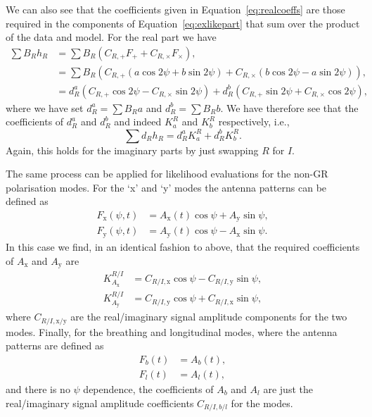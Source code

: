 We can also see that the coefficients given in Equation~\ref{eq:realcoeffs} are those required in the components of
Equation~\ref{eq:exlikepart} that sum over the product of the data and model. For the real part we have
\begin{align}
\sum B_Rh_R &= \sum B_R\left(C_{R,+}F_+ + C_{R,\times}F_{\times} \right), \nonumber \\
 &=\sum B_R\left( C_{R,+}\left(a\cos{2\psi}+b\sin{2\psi}\right) + C_{R,\times}\left(b\cos{2\psi} - a\sin{2\psi} \right) \right), \nonumber \\
 &= d^a_R\left(C_{R,+}\cos{2\psi} - C_{R,\times}\sin{2\psi}\right) + d^b_R\left(C_{R,+}\sin{2\psi} + C_{R,\times}\cos{2\psi} \right),
\end{align}
where we have set $d^a_R = \sum B_R a$ and $d^b_R = \sum B_R b$. We have therefore see that the coefficients
of $d^a_R$ and $d^b_R$ and indeed $K_a^R$ and $K_b^R$ respectively, i.e.,
\begin{equation}
\sum d_Rh_R = d^a_RK_a^R + d^b_RK_b^R.
\end{equation}
Again, this holds for the imaginary parts by just swapping $R$ for $I$.

The same process can be applied for likelihood evaluations for the non-GR polarisation modes. For the `x' and `y'
modes the antenna patterns can be defined as \citep[Equations~32 and 33 of][]{2015PhRvD..91h2002I}
\begin{align}
F_{\text{x}}(\psi,t) &= A_{\text{x}}(t)\cos{\psi} + A_{\text{y}}\sin{\psi}, \nonumber \\
F_{\text{y}}(\psi,t) &= A_{\text{y}}(t)\cos{\psi} - A_{\text{x}}\sin{\psi}.
\end{align}
In this case we find, in an identical fashion to above, that the required coefficients of $A_{\text{x}}$ and $A_{\text{y}}$ are
\begin{align}\label{eq:realcoeffsxy}
K_{A_{\text{x}}}^{R/I} &= C_{R/I,\text{x}}\cos{\psi} - C_{R/I,\text{y}}\sin{\psi}, \nonumber \\
K_{A_{\text{y}}}^{R/I} &= C_{R/I,\text{y}}\cos{\psi} + C_{R/I,\text{x}}\sin{\psi},
\end{align}
where $C_{R/I,\text{x}/\text{y}}$ are the real/imaginary signal amplitude components for the two modes.
Finally, for the breathing and longitudinal modes, where the antenna patterns are defined as \citep[Equations~34 and 35 of][]{2015PhRvD..91h2002I}
\begin{align}
F_{b}(t) &= A_{b}(t), \nonumber \\
F_{l}(t) &= A_{l}(t),
\end{align}
and there is no $\psi$ dependence, the coefficients of $A_{b}$ and $A_l$ are just the real/imaginary signal amplitude coefficients $C_{R/I,b/l}$ for the modes.